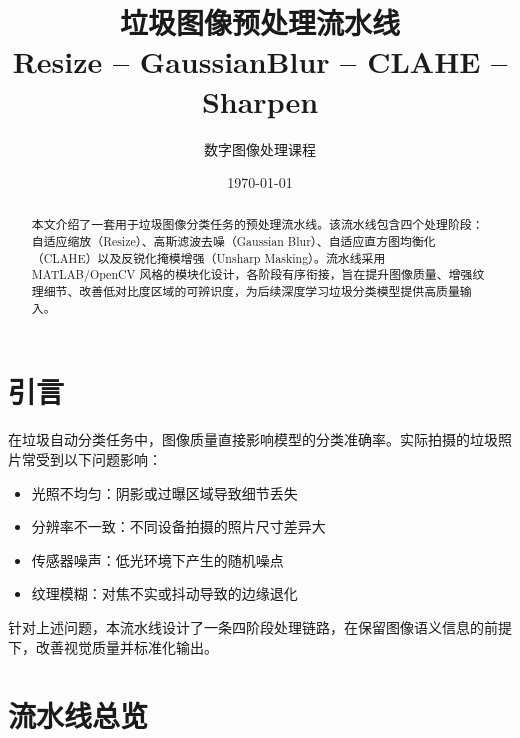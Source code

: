 \documentclass[12pt,a4paper]{ctexart}
\title{\textbf{垃圾图像预处理流水线}\\[6pt]
       \large Resize -- GaussianBlur -- CLAHE -- Sharpen}
\author{数字图像处理课程}
\date{\today}
\begin{document}
\maketitle
\thispagestyle{empty}

\begin{abstract}
\noindent 本文介绍了一套用于垃圾图像分类任务的预处理流水线。该流水线包含四个处理阶段：自适应缩放（Resize）、高斯滤波去噪（Gaussian Blur）、自适应直方图均衡化（CLAHE）以及反锐化掩模增强（Unsharp Masking）。流水线采用 MATLAB/OpenCV 风格的模块化设计，各阶段有序衔接，旨在提升图像质量、增强纹理细节、改善低对比度区域的可辨识度，为后续深度学习垃圾分类模型提供高质量输入。
\end{abstract}

\newpage
\tableofcontents
\newpage

\section{引言}

在垃圾自动分类任务中，图像质量直接影响模型的分类准确率。实际拍摄的垃圾照片常受到以下问题影响：

\begin{itemize}[itemsep=4pt]
  \item 光照不均匀：阴影或过曝区域导致细节丢失
  \item 分辨率不一致：不同设备拍摄的照片尺寸差异大
  \item 传感器噪声：低光环境下产生的随机噪点
  \item 纹理模糊：对焦不实或抖动导致的边缘退化
\end{itemize}

针对上述问题，本流水线设计了一条四阶段处理链路，在保留图像语义信息的前提下，改善视觉质量并标准化输出。

\section{流水线总览}
\end{document}
